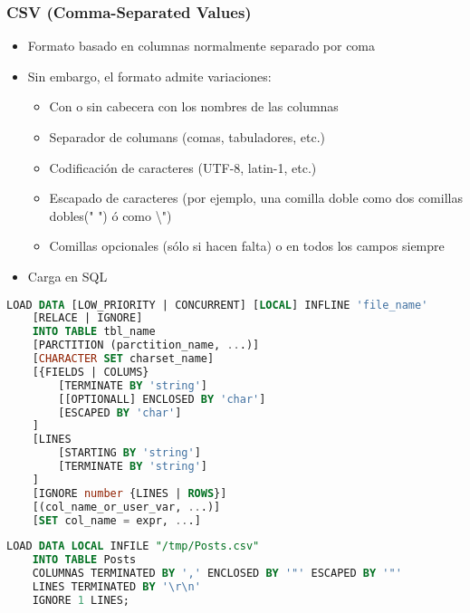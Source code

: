 \subsubsection{CSV (Comma-Separated Values)}
\begin{itemize}
\item Formato basado en columnas normalmente separado por coma
\item Sin embargo, el formato admite variaciones:
\begin{itemize}
\item Con o sin cabecera con los nombres de las columnas
\item Separador de columans (comas, tabuladores, etc.)
\item Codificación de caracteres (UTF-8, latin-1, etc.)
\item Escapado de caracteres (por ejemplo, una comilla doble como dos comillas dobles(" ") ó como \textbackslash")
\item Comillas opcionales (sólo si hacen falta) o en todos los campos siempre
\end{itemize}
\end{itemize}
\begin{itemize}[label=\color{red}\textbullet, leftmargin=*]
	\item \color{lightblue}Carga en SQL
\end{itemize}
\begin{lstlisting}[language=SQL]
LOAD DATA [LOW_PRIORITY | CONCURRENT] [LOCAL] INFLINE 'file_name'
    [RELACE | IGNORE]
    INTO TABLE tbl_name
    [PARCTITION (parctition_name, ...)]
    [CHARACTER SET charset_name]
    [{FIELDS | COLUMS}
        [TERMINATE BY 'string']
        [[OPTIONALL] ENCLOSED BY 'char']
        [ESCAPED BY 'char']
    ]
    [LINES
        [STARTING BY 'string']
        [TERMINATE BY 'string']
    ]
    [IGNORE number {LINES | ROWS}]
    [(col_name_or_user_var, ...)]
    [SET col_name = expr, ...]
\end{lstlisting}

\begin{lstlisting}[language=SQL]
LOAD DATA LOCAL INFILE "/tmp/Posts.csv"
    INTO TABLE Posts
    COLUMNAS TERMINATED BY ',' ENCLOSED BY '"' ESCAPED BY '"'
    LINES TERMINATED BY '\r\n'
    IGNORE 1 LINES;
\end{lstlisting}

